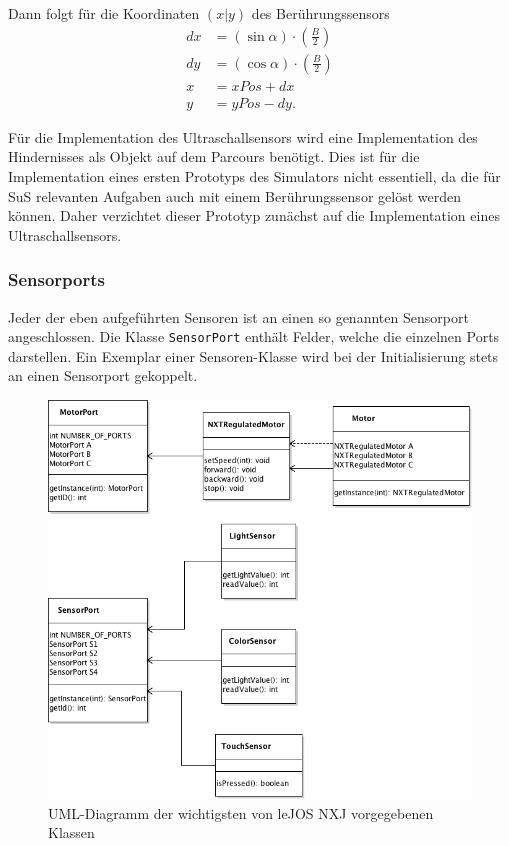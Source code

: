 \documentclass[paper=a4, DIV=calc, BCOR=12mm, twoside=on, onecolumn=on, open = right, titlepage =on, parskip =half-, headsepline = on, footsepline = off, chapterprefix = off, appendixprefix = on, fontsize = 12pt, numbers = noenddot, abstract = on]{scrbook}
\begin{document}
Dann folgt für die Koordinaten $\left( x \vert y \right)$ des Berührungssensors
\begin{align*}
dx & = \left( \sin \alpha \right) \cdot \left( \frac{B}{2} \right)\\
dy & = \left( \cos \alpha \right) \cdot \left( \frac{B}{2} \right)\\
 x & = xPos + dx\\
 y & = yPos - dy.
\end{align*}


Für die Implementation des Ultraschallsensors wird eine Implementation des Hindernisses als Objekt auf dem Parcours benötigt. Dies ist für die Implementation eines ersten Prototyps des Simulators nicht essentiell, da die für SuS relevanten Aufgaben auch mit einem Berührungssensor gelöst werden können. Daher verzichtet dieser Prototyp zunächst auf die Implementation eines Ultraschallsensors.

\subsubsection{Sensorports}
Jeder der eben aufgeführten Sensoren ist an einen so genannten Sensorport angeschlossen. Die Klasse \texttt{SensorPort} enthält Felder, welche die einzelnen Ports darstellen. Ein Exemplar einer Sensoren-Klasse wird bei der Initialisierung stets an einen Sensorport gekoppelt. 
\clearpage


\begin{figure}[H]
\centering
\includegraphics[scale=0.63]{images/uml_api_essenz.png}
\caption[UML-Diagramm der Klassen im \texttt{nxt}-Paket]{UML-Diagramm der wichtigsten von leJOS NXJ vorgegebenen Klassen}
\label{fig:api_uml}
\end{figure}
\end{document}
